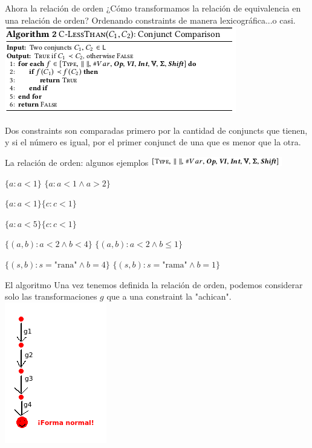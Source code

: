 \documentclass[10pt]{beamer}
\begin{document}
\begin{frame}{Ahora la relación de orden}
	¿Cómo transformamos la relación de equivalencia en una relación de orden? \pause
	Ordenando constraints de manera lexicográfica...o casi. \pause
	\includegraphics[scale=1]{alg2.png}
	
	Dos constraints son comparadas primero por la cantidad de conjuncts que tienen, y si el número es igual, por el primer conjunct de una que es menor que la otra.
\end{frame}

\begin{frame}{La relación de orden: algunos ejemplos}
\includegraphics[scale=1.5]{alg2_imp.png}
	
	$\{a : a<1\}$  $\{a : a<1 \land a>2\}$
	
	
	$\{a : a<1\}$\visible<1,2>{ vs}\visible<3->{$<$}$\{c : c<1\}$

		$\{a : a<5\}$$\{c : c<1\}$


	$\{(a,b) : a<2 \land b<4\}$ $\{(a,b) : a<2 \land b \leq 1\}$

	$\{(s,b) : s= \text{"rana"} \land b=4\}$ $\{(s,b) : s=\text{"rama"} \land b=1\}$

\end{frame}


\begin{frame}{El algoritmo}
	Una vez tenemos definida la relación de orden, podemos considerar solo las transformaciones $g$ que a una constraint la "achican".
	\includegraphics[scale=1]{ordered_descent.png}
	
\end{frame}
\end{document}
